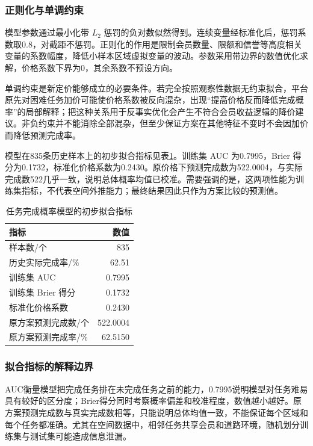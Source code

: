 ﻿\documentclass[UTF8,zihao=-4,a4paper,fontset=fandol]{ctexart}
\begin{document}
\subsubsection{正则化与单调约束}

模型参数通过最小化带 $L_2$ 惩罚的负对数似然得到。连续变量经标准化后，惩罚系数取0.8，对截距不惩罚。正则化的作用是限制会员数量、限额和信誉等高度相关变量的系数幅度，降低小样本区域虚拟变量的波动。参数采用带边界的数值优化求解，价格系数下界为0，其余系数不预设方向。

单调约束是新定价能够成立的必要条件。若完全按照观察性数据无约束拟合，平台原先对困难任务加价可能使价格系数被反向混杂，出现“提高价格反而降低完成概率”的局部解释；把这种关系用于反事实优化会产生不符合会员收益逻辑的降价建议。非负约束并不能消除全部混杂，但至少保证方案在其他特征不变时不会因加价而降低预测完成率。

模型在835条历史样本上的初步拟合指标见表\ref{tab:model-fit}。训练集 AUC 为0.7995，Brier 得分为0.1732，标准化价格系数为0.2430。原价格下预测完成数为522.0004，与实际完成数522几乎一致，说明总体概率均值已校准。需要强调的是，这两项性能为训练集指标，不代表空间外推能力；最终结果因此只作为方案比较的预测值\cite{hosmer2013}。

\begin{table}[H]
  \centering
  \caption{任务完成概率模型的初步拟合指标}
  \label{tab:model-fit}
  \begin{tabular}{lr}
    \toprule
    指标 & 数值 \\
    \midrule
    样本数/个 & 835 \\
    历史实际完成率/\% & 62.51 \\
    训练集 AUC & 0.7995 \\
    训练集 Brier 得分 & 0.1732 \\
    标准化价格系数 & 0.2430 \\
    原方案预测完成数/个 & 522.0004 \\
    原方案预测完成率/\% & 62.5150 \\
    \bottomrule
  \end{tabular}
\end{table}

\subsubsection{拟合指标的解释边界}

AUC衡量模型把完成任务排在未完成任务之前的能力，0.7995说明模型对任务难易具有较好的区分度；Brier得分同时考察概率偏差和校准程度，数值越小越好。原方案预测完成数与真实完成数相等，只能说明总体均值一致，不能保证每个区域和每个任务都准确。尤其在空间数据中，相邻任务共享会员和道路环境，随机划分训练集与测试集可能造成信息泄漏。
\end{document}
